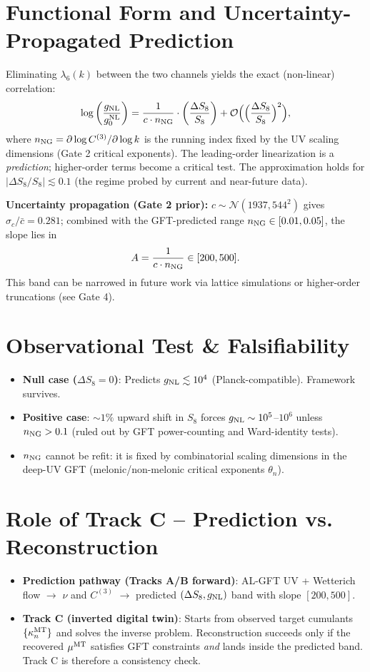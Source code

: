 \documentclass[11pt,a4paper]{article}
\begin{document}
\section{Functional Form and Uncertainty-Propagated Prediction}
Eliminating \(\lambda_6(k)\) between the two channels yields the exact (non-linear) correlation:
\begin{equation}
\log\left(\frac{g_{\rm NL}}{g_0^{\rm NL}}\right) = \frac{1}{c \cdot n_{\rm NG}} \cdot \left(\frac{\Delta S_8}{S_8}\right) + \mathcal{O}\Bigl(\Bigl(\frac{\Delta S_8}{S_8}\Bigr)^2\Bigr),
\end{equation}
where \(n_{\rm NG} = \partial \log C^{(3)} / \partial \log k\) is the running index fixed by the UV scaling dimensions (Gate 2 critical exponents). The leading-order linearization is a \emph{prediction}; higher-order terms become a critical test. The approximation holds for \(|\Delta S_8/S_8| \lesssim 0.1\) (the regime probed by current and near-future data).

\textbf{Uncertainty propagation (Gate 2 prior):} \(c \sim \mathcal{N}(1937, 544^2)\) gives \(\sigma_c / \bar{c} = 0.281\); combined with the GFT-predicted range \(n_{\rm NG} \in [0.01, 0.05]\), the slope lies in
\[
A = \frac{1}{c \cdot n_{\rm NG}} \in [200, 500].
\]
This band can be narrowed in future work via lattice simulations or higher-order truncations (see Gate 4).

\section{Observational Test \& Falsifiability}
\begin{itemize}
\item \textbf{Null case (\(\Delta S_8 = 0\))}: Predicts \(g_{\rm NL} \lesssim 10^4\) (Planck-compatible). Framework survives.
\item \textbf{Positive case}: \(\sim 1\%\) upward shift in \(S_8\) forces \(g_{\rm NL} \sim 10^5\)--\(10^6\) unless \(n_{\rm NG} > 0.1\) (ruled out by GFT power-counting and Ward-identity tests).
\item \(n_{\rm NG}\) cannot be refit: it is fixed by combinatorial scaling dimensions in the deep-UV GFT (melonic/non-melonic critical exponents \(\theta_n\)).
\end{itemize}

\section{Role of Track C -- Prediction vs. Reconstruction}
\begin{itemize}
\item \textbf{Prediction pathway (Tracks A/B forward)}: AL-GFT UV + Wetterich flow \(\to\) \(\nu\) and \(C^{(3)}\) \(\to\) predicted \((\Delta S_8, g_{\rm NL})\) band with slope \([200,500]\).
\item \textbf{Track C (inverted digital twin)}: Starts from observed target cumulants \(\{\kappa_n^{\rm MT}\}\) and solves the inverse problem. Reconstruction succeeds only if the recovered \(\mu^{\rm MT}\) satisfies GFT constraints \emph{and} lands inside the predicted band. Track C is therefore a consistency check.
\end{itemize}
\end{document}
